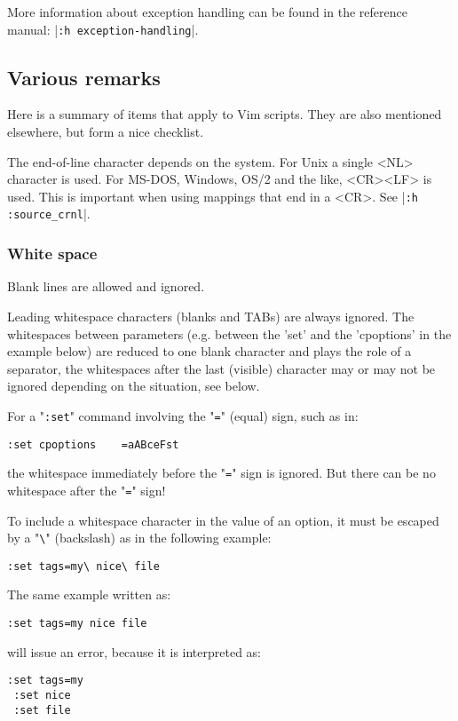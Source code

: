 More information about exception handling can be found in the reference manual: |\verb!:h exception-handling!|.
\subsection{Various remarks}
Here is a summary of items that apply to Vim scripts.
They are also mentioned elsewhere, but form a nice checklist.

The end-of-line character depends on the system.
For Unix a single <NL> character is used.
For MS-DOS, Windows, OS/2 and the like, <CR><LF> is used.
This is important when using mappings that end in a <CR>.
See |\verb!:h :source_crnl!|.
\subsubsection{White space}
Blank lines are allowed and ignored.

Leading whitespace characters (blanks and TABs) are always ignored.
The whitespaces between parameters (e.g. between the 'set' and the 'cpoptions' in the example below) are reduced to one blank character and plays the role of a separator, the whitespaces after the last (visible) character may or may not be ignored depending on the situation, see below.

For a "\verb!:set!" command involving the "\verb!=!" (equal) sign, such as in:

\begin{Verbatim}[samepage=true]
 :set cpoptions    =aABceFst
\end{Verbatim}

the whitespace immediately before the "\verb!=!" sign is ignored.
But there can be no whitespace after the "\verb!=!" sign!

To include a whitespace character in the value of an option, it must be escaped by a "\verb!\!" (backslash)  as in the following example:

\begin{Verbatim}[samepage=true]
 :set tags=my\ nice\ file
\end{Verbatim}

The same example written as:

\begin{Verbatim}[samepage=true]
 :set tags=my nice file
\end{Verbatim}

will issue an error, because it is interpreted as:

\begin{Verbatim}[samepage=true]
 :set tags=my
 :set nice
 :set file
\end{Verbatim}

